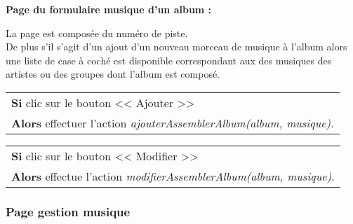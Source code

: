         
            \begin{paragraphe}
                \textbf{Page du formulaire musique d'un album :}
            \end{paragraphe}
            
            \begin{paragraphe}
                La page est composée du numéro de piste. \\
                De plus s'il s'agit d'un ajout d'un nouveau morceau de musique à l'album alors une liste de case à coché est disponible correspondant aux des musiques des artistes ou des groupes dont l'album est composé.
            \end{paragraphe}
            
            \begin{center}
                \begin{tabular}{l}
                    \textbf{Si} clic sur le bouton << Ajouter >> \\
                    \textbf{Alors} effectuer l'action \emph{ajouterAssemblerAlbum(album, musique)}.
                \end{tabular}
            \end{center}
            
            
        \clearpage
            
            \begin{center}
                \begin{tabular}{l}
                    \textbf{Si} clic sur le bouton << Modifier >> \\
                    \textbf{Alors} effectue l'action \emph{modifierAssemblerAlbum(album, musique)}.
                \end{tabular}
            \end{center}
            
        
    \newpage

		\subsubsection{Page gestion musique}

